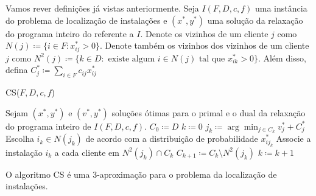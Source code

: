 Vamos rever definições já vistas anteriormente. 
Seja $I(F,D,c,f)$ uma instância do problema de localização de instalações e $(x^*,y^*)$ uma solução da relaxação do programa inteiro do referente a $I$. 
Denote os vizinhos de um cliente $j$ como $N(j) \coloneqq\{i \in F : x^*_{ij} > 0\}$. 
Denote também os vizinhos dos vizinhos de um cliente $j$ como $N^2(j) \coloneqq \{ k \in D : \text{ existe algum } i \in N(j) \text{ tal que } x^*_{ik} > 0\}$.
Além disso, defina $C^*_j \coloneqq \sum_{i \in F} c_{ij}x^*_{ij}$ 

\begin{algorithm}[tbh]
\caption{CS($F,D,c,f$)}
\begin{algorithmic}[1]
        \State Sejam $(x^*,y^*)$ e $(v^*,y^*)$ soluções ótimas para o primal e o dual da relaxação do programa inteiro de $I(F,D,c,f)$.
        \State $C_0 \coloneqq D$
        \State $k \coloneqq 0$
        \State $j_k \coloneqq \arg \min_{j \in C_k} v^*_j + C_j^*$
        \State Escolha $i_k \in N(j_k)$ de acordo com a distribuição de probabilidade $x^*_{ij_k}$
        \State Associe a instalação $i_k$ a cada cliente em $N^2(j_k) \cap C_k$
        \State $C_{k+1} \coloneqq C_k \setminus N^2(j_k)$
        \State $k \coloneqq k +1$
        \EndWhile
\end{algorithmic}
\end{algorithm}

\begin{theorem} O algoritmo {\sc CS} é uma 3-aproximação para o problema da localização de instalações.
\end{theorem}

